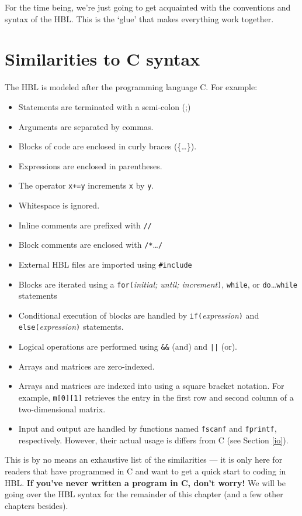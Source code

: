 \documentclass[12pt]{book}
\begin{document}
 For the time being, we're just going to get acquainted with the conventions and syntax of the HBL.  This is the `glue' that makes everything work together.


\section {Similarities to C syntax}

The HBL is modeled after the programming language C.  For example:

\begin{itemize}
\item Statements are terminated with a semi-colon (;) 
\item Arguments are separated by commas.
\item Blocks of code are enclosed in curly braces (\{\ldots\}). 
\item Expressions are enclosed in parentheses.
\item The operator {\tt x+=y} increments {\tt x} by {\tt y}.
\item Whitespace is ignored.
\item Inline comments are prefixed with {\tt //}
\item Block comments are enclosed with {\tt /*}\ldots{\tt */}
\item External HBL files are imported using {\tt \#include}
\item Blocks are iterated using a {\tt for(}{\it initial; until; increment}{\tt )}, {\tt while}, or {\tt do}\ldots{\tt while} statements
\item Conditional execution of blocks are handled by {\tt if(}{\it expression}{\tt )} and {\tt else(}{\it expression}{\tt )} statements.
\item Logical operations are performed using {\tt \&\&} (and) and {\tt ||} (or).
\item Arrays and matrices are zero-indexed.
\item Arrays and matrices are indexed into using a square bracket notation.  For example, {\tt m[0][1]} retrieves the entry in the first row and second column of a two-dimensional matrix.
\item Input and output are handled by functions named {\tt fscanf} and {\tt fprintf}, respectively.  However, their actual usage is differs from C (see Section \ref{io}).
\end{itemize}

\noindent This is by no means an exhaustive list of the similarities --- it is only here for readers that have programmed in C and want to get a quick start to coding in HBL.  \textbf{If you've never written a program in C, don't worry!}  We will be going over the HBL syntax for the remainder of this chapter (and a few other chapters besides).
\end{document}
